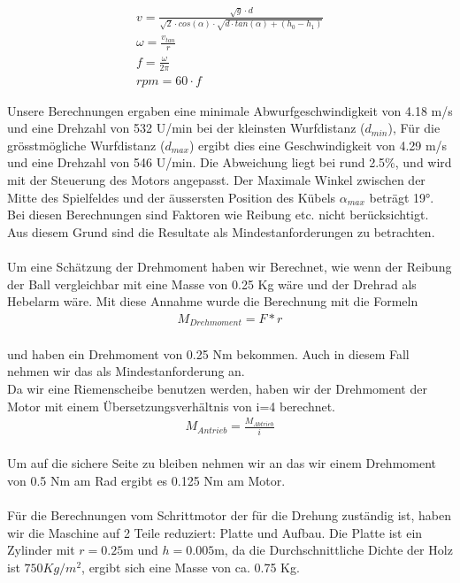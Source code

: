 \begin{gather}
	v=\frac{\sqrt{g} \cdot d}{\sqrt{2} \cdot cos(\alpha) \cdot \sqrt{d \cdot tan(\alpha)+(h_0-h_1)}}\\
	\omega=\frac{v_{tan}}{r}\\
	f=\frac{\omega}{2\pi}\\
	rpm=60 \cdot f
\end{gather}

Unsere Berechnungen ergaben eine minimale Abwurfgeschwindigkeit von 4.18 m/s und eine Drehzahl von 532 U/min bei der kleinsten Wurfdistanz ($d_{min}$), 
Für die grösstmögliche Wurfdistanz ($d_{max}$) ergibt dies  eine Geschwindigkeit von 4.29 m/s und eine Drehzahl von 546 U/min. 
Die Abweichung liegt bei rund 2.5\%, und wird mit der Steuerung des Motors angepasst.
Der Maximale Winkel zwischen der Mitte des Spielfeldes und der äussersten Position des Kübels $\alpha_{max}$ beträgt 19°. \\
Bei diesen Berechnungen sind Faktoren wie Reibung etc. nicht berücksichtigt. Aus diesem Grund sind die Resultate als Mindestanforderungen zu betrachten.\\ \\
Um eine Schätzung der Drehmoment haben wir Berechnet, wie wenn der Reibung der Ball vergleichbar mit eine Masse von 0.25 Kg wäre und der Drehrad als Hebelarm wäre. Mit diese Annahme wurde die Berechnung mit die Formeln\\
\begin{gather}
	M_{Drehmoment}=F*r
\end{gather}\\
und haben ein Drehmoment von 0.25 Nm bekommen. Auch in diesem Fall nehmen wir das als Mindestanforderung an.\\
Da wir eine Riemenscheibe benutzen werden, haben wir der Drehmoment der Motor mit einem Übersetzungsverhältnis von i=4 berechnet.\\
\begin{gather}
	M_{Antrieb}=\frac{M_{Abtrieb}}{i}
\end{gather}\\
Um auf die sichere Seite zu bleiben nehmen wir an das wir einem Drehmoment von 0.5 Nm am Rad ergibt es 0.125 Nm am Motor.\\ \\
Für die Berechnungen vom Schrittmotor der für die Drehung zuständig ist, haben wir die Maschine auf 2 Teile reduziert: Platte und Aufbau.
Die Platte ist ein Zylinder mit $r=0.25$m und $h=0.005$m, da die Durchschnittliche Dichte der Holz ist $750 Kg/m^2$, ergibt sich eine Masse von ca. 0.75 Kg.
